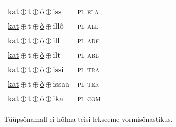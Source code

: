 \begin{minipage}{\textwidth}
\begin{sideways}
\begin{tabular}{l l}
\underline{kat}\,$\oplus$\,t\,$\oplus$\,\underline{õ}\,$\oplus$\,iss & \textsc{ pl ela } \\
\underline{kat}\,$\oplus$\,t\,$\oplus$\,\underline{õ}\,$\oplus$\,illõ & \textsc{ pl all } \\
\underline{kat}\,$\oplus$\,t\,$\oplus$\,\underline{õ}\,$\oplus$\,ill & \textsc{ pl ade } \\
\underline{kat}\,$\oplus$\,t\,$\oplus$\,\underline{õ}\,$\oplus$\,ilt & \textsc{ pl abl } \\
\underline{kat}\,$\oplus$\,t\,$\oplus$\,\underline{õ}\,$\oplus$\,issi & \textsc{ pl tra } \\
\underline{kat}\,$\oplus$\,t\,$\oplus$\,\underline{õ}\,$\oplus$\,issaa & \textsc{ pl ter } \\
\underline{kat}\,$\oplus$\,t\,$\oplus$\,\underline{õ}\,$\oplus$\,ika & \textsc{ pl com } \\
\end{tabular}
\end{sideways}
\label{tab:tüüpsõnamall-katõ}

\end{minipage}

 
\vspace{1em}
\noindent Tüüpsõnamall  ei hõlma teisi lekseeme vormi\-sõnastikus.
